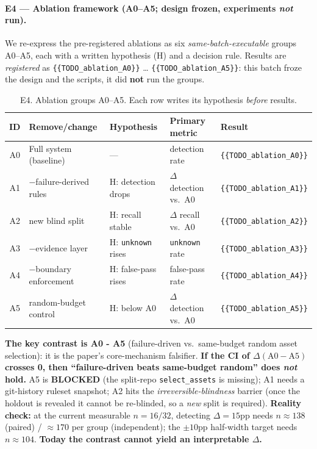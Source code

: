 \documentclass{article}
\begin{document}
\paragraph{E4 --- Ablation framework (A0--A5; design frozen, experiments \emph{not} run).}
We re-express the pre-registered ablations as six \emph{same-batch-executable} groups A0--A5, each
with a written hypothesis (H) and a decision rule. Results are \emph{registered} as
\texttt{\{\{TODO\_ablation\_A0\}\}} \dots{} \texttt{\{\{TODO\_ablation\_A5\}\}}: this batch froze the
design and the scripts, it did \textbf{not} run the groups.
\begin{table}[t]
\caption{E4. Ablation groups A0--A5. Each row writes its hypothesis \emph{before} results.}
\label{tab:e4}
\centering
\small
\begin{tabular}{@{}clp{3.3cm}p{3.6cm}l@{}}
\toprule
ID & Remove/change & Hypothesis & Primary metric & Result \\
\midrule
A0 & Full system (baseline) & --- & detection rate & \texttt{\{\{TODO\_ablation\_A0\}\}} \\
A1 & $-$failure-derived rules & H: detection drops & $\Delta$ detection vs.\ A0 & \texttt{\{\{TODO\_ablation\_A1\}\}} \\
A2 & new blind split & H: recall stable & $\Delta$ recall vs.\ A0 & \texttt{\{\{TODO\_ablation\_A2\}\}} \\
A3 & $-$evidence layer & H: \texttt{unknown} rises & \texttt{unknown} rate & \texttt{\{\{TODO\_ablation\_A3\}\}} \\
A4 & $-$boundary enforcement & H: false-pass rises & false-pass rate & \texttt{\{\{TODO\_ablation\_A4\}\}} \\
A5 & random-budget control & H: below A0 & $\Delta$ detection vs.\ A0 & \texttt{\{\{TODO\_ablation\_A5\}\}} \\
\bottomrule
\end{tabular}
\end{table}
\textbf{The key contrast is A0 - A5} (failure-driven vs.\ same-budget random asset selection): it is
the paper's core-mechanism falsifier. \textbf{If the CI of $\Delta(\text{A0} - \text{A5})$ crosses
0, then ``failure-driven beats same-budget random'' does \emph{not} hold.} A5 is \textbf{BLOCKED}
(the split-repo \texttt{select\_assets} is missing); A1 needs a git-history ruleset snapshot; A2
hits the \emph{irreversible-blindness} barrier (once the holdout is revealed it cannot be re-blinded,
so a \emph{new} split is required). \textbf{Reality check:} at the current measurable $n=16/32$,
detecting $\Delta=15$pp needs $n\approx138$ (paired) / $\approx170$ per group (independent); the
$\pm10$pp half-width target needs $n\approx104$. \textbf{Today the contrast cannot yield an
interpretable $\Delta$.}
\end{document}
